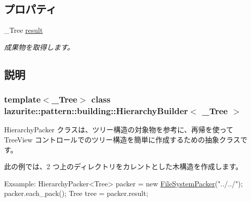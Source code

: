 \subsection*{プロパティ}
\begin{DoxyCompactItemize}
\item 
\_\-Tree \hyperlink{classlazurite_1_1pattern_1_1building_1_1_hierarchy_builder_3_01___tree_01_4_a51789f7637e2bd5b35aae74d53d0e799}{result}
\begin{DoxyCompactList}\small\item\em 成果物を取得します。 \item\end{DoxyCompactList}\end{DoxyCompactItemize}


\subsection{説明}
\subsubsection*{template$<$\_\-Tree$>$ class lazurite::pattern::building::HierarchyBuilder$<$ \_\-Tree $>$}

HierarchyPacker クラスは、ツリー構造の対象物を参考に、再帰を使って TreeView コントロールでのツリー構造を簡単に作成するための抽象クラスです。

此の例では、2 つ上のディレクトリをカレントとした木構造を作成します。 
\begin{DoxyPre}
 Exsample:
      HierarchyPacker<Tree> packer = new \hyperlink{classlazurite_1_1pattern_1_1building_1_1_file_system_packer}{FileSystemPacker}("../../");
      packer.each\_pack();
      Tree tree = packer.result;
 \end{DoxyPre}
 

